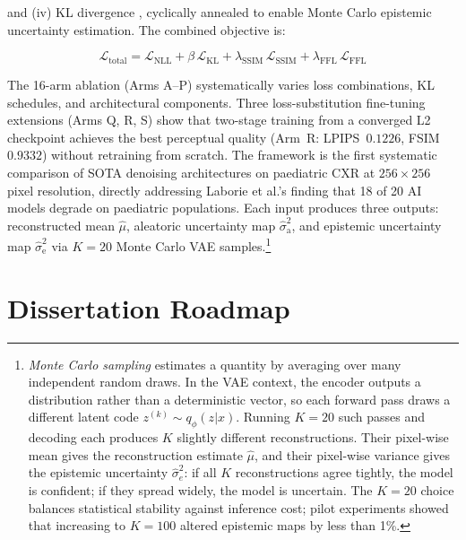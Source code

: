 \documentclass[12pt, a4paper, twoside, openright]{book}
\begin{document}
and (iv) KL divergence \cite{kingma_auto-encoding_2014}, cyclically annealed to enable Monte Carlo epistemic uncertainty estimation. The combined objective is:

\begin{equation}
\label{eq:intro:totalloss}
\mathcal{L}_\mathrm{total} =
\mathcal{L}_\mathrm{NLL}
+ \beta\,\mathcal{L}_\mathrm{KL}
+ \lambda_{\mathrm{SSIM}}\,\mathcal{L}_\mathrm{SSIM}
+ \lambda_{\mathrm{FFL}}\,\mathcal{L}_\mathrm{FFL}
\end{equation}

The 16-arm ablation (Arms A--P) systematically varies loss combinations, KL schedules, and architectural components. Three loss-substitution fine-tuning extensions (Arms Q, R, S) show that two-stage training from a converged L2 checkpoint achieves the best perceptual quality (Arm~R: LPIPS~$0.1226$, FSIM~$0.9332$) without retraining from scratch. The framework is the first systematic comparison of SOTA denoising architectures on paediatric CXR at $256\times256$ pixel resolution, directly addressing Laborie et al.'s \cite{laborie_scoping_2026} finding that 18 of 20 AI models degrade on paediatric populations. Each input produces three outputs: reconstructed mean $\hat{\mu}$, aleatoric uncertainty map $\hat{\sigma}^2_\mathrm{a}$, and epistemic uncertainty map $\hat{\sigma}^2_\mathrm{e}$ via $K=20$ Monte Carlo VAE samples.\footnote{\emph{Monte Carlo sampling} estimates a quantity by averaging over many independent random draws. In the VAE context, the encoder outputs a distribution rather than a deterministic vector, so each forward pass draws a different latent code $z^{(k)} \sim q_\phi(z|x)$. Running $K=20$ such passes and decoding each produces $K$ slightly different reconstructions. Their pixel-wise mean gives the reconstruction estimate $\hat{\mu}$, and their pixel-wise variance gives the epistemic uncertainty $\hat{\sigma}^2_e$: if all $K$ reconstructions agree tightly, the model is confident; if they spread widely, the model is uncertain. The $K=20$ choice balances statistical stability against inference cost; pilot experiments showed that increasing to $K=100$ altered epistemic maps by less than 1\%.}

\section{Dissertation Roadmap}
\label{sec:intro:roadmap}
\end{document}
